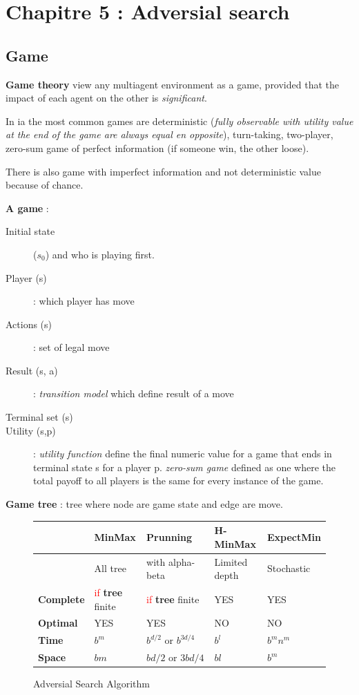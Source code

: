 \section{Chapitre 5 : Adversial search}

\subsection{Game}

\textbf{Game theory} view any multiagent environment as a game, provided that
the impact of each agent on the other is \textit{significant}.

In ia the most common games are deterministic (\textit{fully observable with utility value at
the end of the game are always equal en opposite}), turn-taking, two-player, zero-sum game of
perfect information (if someone win, the other loose).

There is also game with imperfect information and not deterministic value because of chance.


\textbf{A game} :
\begin{description}
    \item[Initial state] ($s_0$) and who is playing first.
    \item[Player (s)] : which player has move
    \item[Actions (s)] : set of legal move
    \item[Result (s, a)] : \textit{transition model} which define result of a move
    \item[Terminal set (s)] 
    \item[Utility (s,p)] : \textit{utility function} define the final numeric value for a game that ends in terminal state s for a player p.
        \textit{zero-sum game} defined as one where the total payoff to all players is the same for every instance of the game.
\end{description}

\textbf{Game tree} : tree where node are game state and edge are move.

\begin{figure}[h]
\centering
\begin{tabular}{|l|m{3cm}|m{3cm}|m{3cm}|m{3cm}|}
\hline
& \textbf{MinMax} & \textbf{Prunning} & \textbf{H-MinMax} & \textbf{ExpectMin} \\
\hline
& All tree & with alpha-beta & Limited depth & Stochastic \\

\hline
\hline
\textbf{Complete} & \textcolor{red}{if} \textbf{tree} finite & \textcolor{red}{if} \textbf{tree} finite  & YES  & YES \\
\hline
\textbf{Optimal} & YES & YES & NO & NO \\
\hline
\textbf{Time} & $b^{m}$    & $b^{d/2}\textrm{ or }b^{3d/4}$ & $b^l$ & $b^m n^m$\\
\hline
\textbf{Space} & $bm$ & $bd/2\textrm{ or }3bd/4$ & $bl$ & $b^m$ \\
\hline

\end{tabular}
\caption{Adversial Search Algorithm}
\end{figure}



